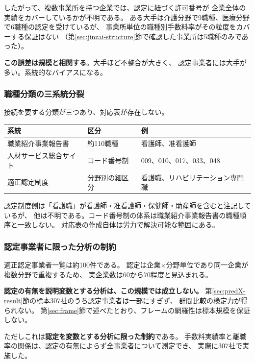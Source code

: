 したがって、複数事業所を持つ企業では、認定に紐づく許可番号が
企業全体の実績をカバーしているかが不明である。
ある大手は介護分野で9職種、医療分野で6職種の認定を受けているが、
事業所単位の職種別手数料率がその粒度をカバーする保証はない
（第\ref{sec:jinzai-structure}節で確認した事業所は5職種のみであった）。

\textbf{この誤差は規模と相関する}。大手ほど不整合が大きく、
認定事業者には大手が多い。系統的なバイアスになる。

\subsubsection{職種分類の三系統分裂}

接続を要する分類が三つあり、対応表が存在しない。

\begin{center}
\begin{tabularx}{\textwidth}{@{}llX@{}}
\toprule
系統 & 区分 & 例 \\
\midrule
職業紹介事業報告書 & 約110職種 & 看護師、准看護師 \\
人材サービス総合サイト & コード番号制 & 009、010、017、033、048 \\
適正認定制度 & 分野別の細区分 & 看護職、リハビリテーション専門職 \\
\bottomrule
\end{tabularx}
\label{tab:occupation-classification-systems}
\end{center}

認定制度側は「看護職」が看護師・准看護師・保健師・助産師を含むと注記しているが、
他は不明である。コード番号制の体系は職業紹介事業報告書の職種順序と一致しない。
対応表の作成自体は労力で解決可能な範囲にある。

\subsubsection{認定事業者に限った分析の制約}
\label{sec:nintei-small}

適正認定事業者一覧は約100件である。
認定は企業$\times$分野単位であり同一企業が複数分野で重複するため、
実企業数は60から70程度と見込まれる。

\textbf{認定の有無を説明変数とする分析は、この規模では成立しない。}
第\ref{sec:predX-result}節の標本307社のうち認定事業者は一部にすぎず、
群間比較の検定力が得られない。
第\ref{sec:frame}節で述べたとおり、フレームの網羅性は標本規模を保証しない。

ただしこれは\textbf{認定を変数とする分析に限った制約}である。
手数料実績率と離職率の関係は、認定の有無によらず全事業者について測定でき、
実際に307社で実施した。

